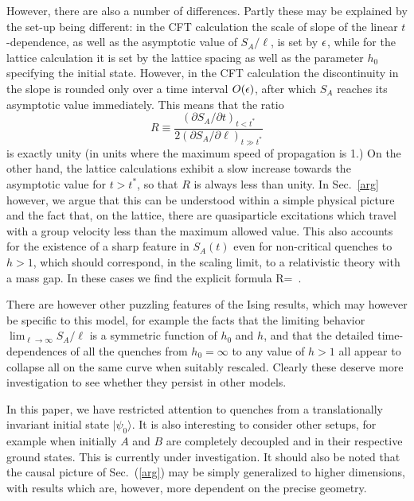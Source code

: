 However, there are also a number of differences. Partly these may be
explained by
the set-up being different: in the CFT calculation the scale of
slope of the linear $t$-dependence, as well as the asymptotic value of
$S_A/\ell$, is set by $\epsilon$, while for the lattice calculation it is set
by the lattice spacing as well as the parameter $h_0$ specifying the
initial state. However, in the CFT calculation the discontinuity in the
slope is rounded only over a time interval $O(\epsilon)$, after which $S_A$
reaches its asymptotic value immediately. This means that the ratio
\begin{equation}
R\equiv\frac{(\partial S_A/\partial t)_{t<t^*}}{2
(\partial S_A/\partial\ell)_{t\gg t^*}}
\end{equation}
is exactly unity (in units where the maximum speed of propagation is 1.)
On the other hand, the lattice calculations exhibit a slow increase
towards the asymptotic value for $t>t^*$, so that $R$ is always less
than unity. In Sec.~\ref{arg} however, we argue that this can be
understood within a simple physical picture and the fact that, on the
lattice, there are quasiparticle excitations which travel with a group
velocity less than the maximum allowed value. This also accounts for the
existence of a sharp feature in $S_A(t)$ even for non-critical quenches
to $h>1$, which should correspond, in the scaling limit, to a 
relativistic theory with a mass gap.
In these cases we find the explicit formula 
\be
R= \,.
\ee

There are however other puzzling features of the Ising results, which may
however be specific to this model, for example the facts that the
limiting behavior $\lim_{\ell\to\infty}S_A/\ell$ is a symmetric
function of $h_0$ and $h$, and that the detailed time-dependences of all the
quenches from $h_0=\infty$ to any value of $h>1$ all appear to collapse
all on the same curve when suitably rescaled. Clearly these 
deserve more investigation to see whether they persist in other models.

In this paper, we have restricted attention to quenches from a
translationally invariant initial state $|\psi_0\rangle$. It is also
interesting to consider other setups, for example when initially $A$ and
$B$ are completely decoupled and in their respective ground states. This
is currently under investigation. It should also be noted that the
causal picture of Sec.~(\ref{arg}) may be simply generalized to higher
dimensions, with results which are, however, more dependent on the
precise geometry.

